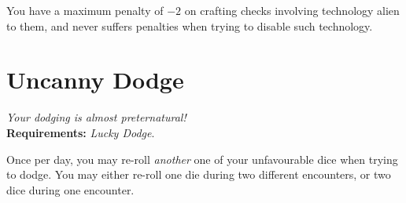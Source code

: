 You have a maximum penalty of $-2$ on crafting checks involving technology alien to them, and never suffers penalties when trying to disable such technology.

\section{Uncanny Dodge}
\textit{Your dodging is almost preternatural!}\\
\textbf{Requirements:} \textit{Lucky Dodge}.

Once per day, you may re-roll \textit{another} one of your unfavourable dice when trying to dodge.
You may either re-roll one die during two different encounters, or two dice during one encounter.